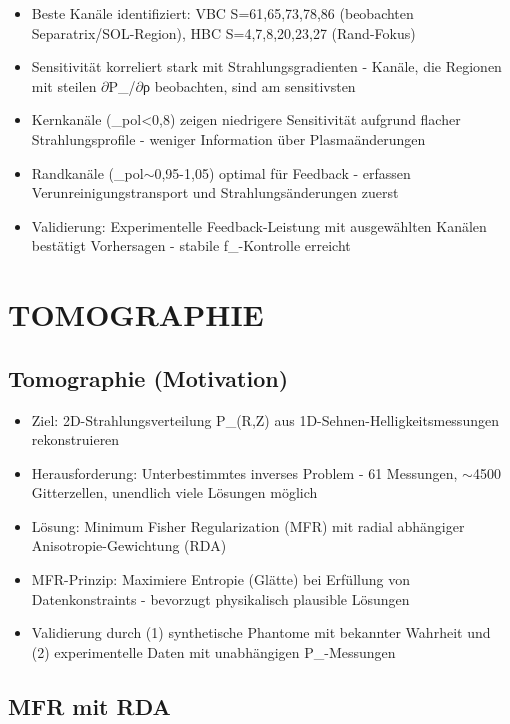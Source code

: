 \documentclass[11pt,a4paper]{article}
\begin{document}
\begin{itemize}
\item Beste Kanäle identifiziert: VBC S={61,65,73,78,86} (beobachten Separatrix/SOL-Region), HBC S={4,7,8,20,23,27} (Rand-Fokus)
\item Sensitivität korreliert stark mit Strahlungsgradienten - Kanäle, die Regionen mit steilen $\partial$P_{}/$\partial$ρ beobachten, sind am sensitivsten
\item Kernkanäle (\rho_pol<0,8) zeigen niedrigere Sensitivität aufgrund flacher Strahlungsprofile - weniger Information über Plasmaänderungen
\item Randkanäle (\rho_pol$\sim$0,95-1,05) optimal für Feedback - erfassen Verunreinigungstransport und Strahlungsänderungen zuerst
\item Validierung: Experimentelle Feedback-Leistung mit ausgewählten Kanälen bestätigt Vorhersagen - stabile f_{}-Kontrolle erreicht
\end{itemize}

\section{TOMOGRAPHIE}

\subsection{Tomographie (Motivation)}

\begin{itemize}
\item Ziel: 2D-Strahlungsverteilung P_{}(R,Z) aus 1D-Sehnen-Helligkeitsmessungen rekonstruieren
\item Herausforderung: Unterbestimmtes inverses Problem - 61 Messungen, $\sim$4500 Gitterzellen, unendlich viele Lösungen möglich
\item Lösung: Minimum Fisher Regularization (MFR) mit radial abhängiger Anisotropie-Gewichtung (RDA)
\item MFR-Prinzip: Maximiere Entropie (Glätte) bei Erfüllung von Datenkonstraints - bevorzugt physikalisch plausible Lösungen
\item Validierung durch (1) synthetische Phantome mit bekannter Wahrheit und (2) experimentelle Daten mit unabhängigen P_{}-Messungen
\end{itemize}

\subsection{MFR mit RDA}
\end{document}
